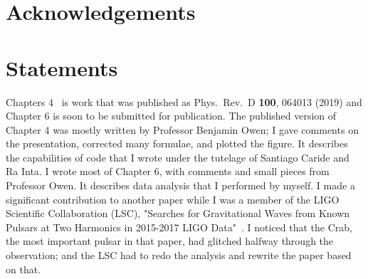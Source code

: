 \documentclass{ttuthes2007}
\begin{document}
\frontmatter


\chapter{\textbf{Acknowledgements}}


 

\newpage
\chapter{Statements}
Chapters 4~\cite{PhysRevD.100.064013} is work that was published as Phys.\ Rev.\
D \textbf{100}, 064013 (2019) and Chapter 6 is soon to be submitted for publication. The published version
of Chapter 4 was mostly written by Professor Benjamin Owen; I gave comments on
the presentation, corrected many formulae, and plotted the figure. It describes
the capabilities of code that I wrote under the tutelage of Santiago Caride and
Ra Inta. I wrote most of Chapter 6, with comments and small pieces from
Professor Owen. It describes data analysis that I performed by myself. I made a
significant contribution to another paper while I was a member of the LIGO
Scientific Collaboration (LSC), "Searches for Gravitational Waves from Known
Pulsars at Two Harmonics in 2015-2017 LIGO Data"~\cite{Abbott1_2019}.
 I noticed that the Crab, the most important pulsar in that
paper, had glitched halfway through the observation; and the LSC had to redo the
analysis and rewrite the paper based on that.
\end{document}
